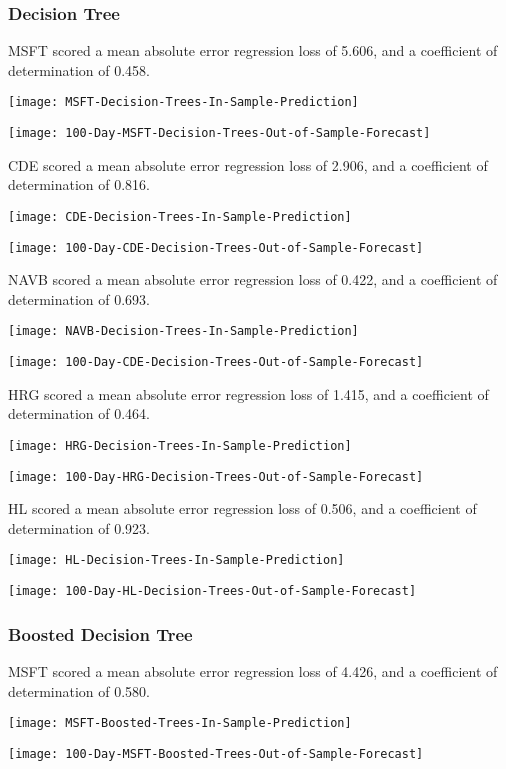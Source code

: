 \subsubsection{Decision Tree}
MSFT scored a mean absolute error regression loss of 5.606, and a coefficient of determination of 0.458.

\texttt{[image: MSFT-Decision-Trees-In-Sample-Prediction]}

\texttt{[image: 100-Day-MSFT-Decision-Trees-Out-of-Sample-Forecast]}

CDE scored a mean absolute error regression loss of 2.906, and a coefficient of determination of 0.816.

\texttt{[image: CDE-Decision-Trees-In-Sample-Prediction]}

\texttt{[image: 100-Day-CDE-Decision-Trees-Out-of-Sample-Forecast]}

NAVB scored a mean absolute error regression loss of 0.422, and a coefficient of determination of 0.693.

\texttt{[image: NAVB-Decision-Trees-In-Sample-Prediction]}

\texttt{[image: 100-Day-CDE-Decision-Trees-Out-of-Sample-Forecast]}

HRG scored a mean absolute error regression loss of 1.415, and a coefficient of determination of 0.464.

\texttt{[image: HRG-Decision-Trees-In-Sample-Prediction]}

\texttt{[image: 100-Day-HRG-Decision-Trees-Out-of-Sample-Forecast]}

HL scored a mean absolute error regression loss of 0.506, and a coefficient of determination of 0.923.

\texttt{[image: HL-Decision-Trees-In-Sample-Prediction]}

\texttt{[image: 100-Day-HL-Decision-Trees-Out-of-Sample-Forecast]}

\subsubsection{Boosted Decision Tree}
MSFT scored a mean absolute error regression loss of 4.426, and a coefficient of determination of 0.580.

\texttt{[image: MSFT-Boosted-Trees-In-Sample-Prediction]}

\texttt{[image: 100-Day-MSFT-Boosted-Trees-Out-of-Sample-Forecast]}

